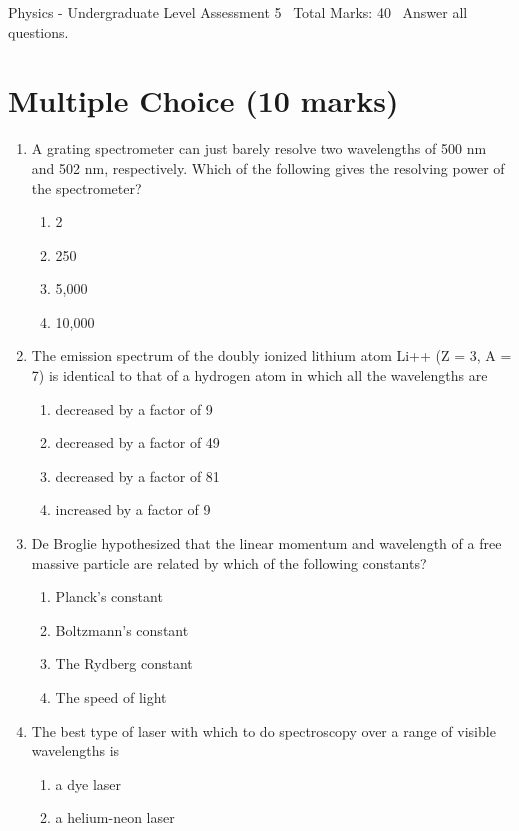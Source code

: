 \documentclass[12pt]{article}
\begin{document}
\begin{center}
Physics - Undergraduate Level Assessment 5 \
Total Marks: 40 \
Answer all questions.
\end{center}

\section*{Multiple Choice (10 marks)}
\begin{enumerate}[label=\arabic*.]
\item A grating spectrometer can just barely resolve two wavelengths of 500 nm and 502 nm, respectively. Which of the following gives the resolving power of the spectrometer?
\begin{enumerate}[label=(\alph*)]
    \item 2
    \item 250
    \item 5,000
    \item 10,000
\end{enumerate}
\item The emission spectrum of the doubly ionized lithium atom Li++ (Z = 3, A = 7) is identical to that of a hydrogen atom in which all the wavelengths are
\begin{enumerate}[label=(\alph*)]
    \item decreased by a factor of 9
    \item decreased by a factor of 49
    \item decreased by a factor of 81
    \item increased by a factor of 9
\end{enumerate}
\item De Broglie hypothesized that the linear momentum and wavelength of a free massive particle are related by which of the following constants?
\begin{enumerate}[label=(\alph*)]
    \item Planck's constant
    \item Boltzmann's constant
    \item The Rydberg constant
    \item The speed of light
\end{enumerate}
\item The best type of laser with which to do spectroscopy over a range of visible wavelengths is
\begin{enumerate}[label=(\alph*)]
    \item a dye laser
    \item a helium-neon laser

\end{enumerate}
\end{enumerate}
\end{document}
